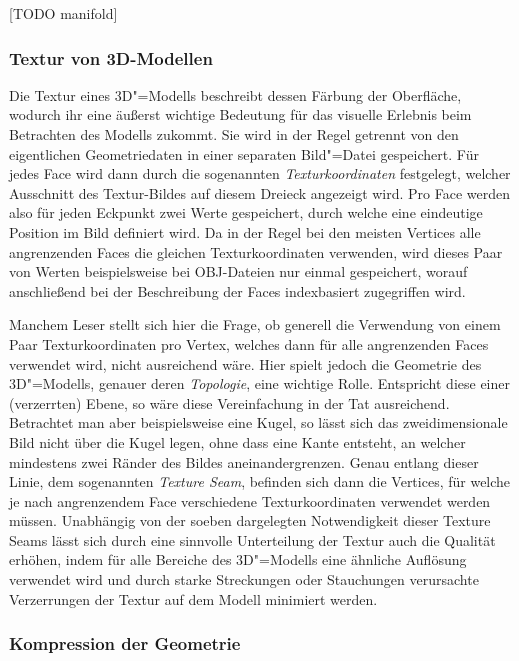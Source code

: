 [TODO manifold] \cite[S.~3]{botsch2010}

\subsubsection{Textur von 3D-Modellen}

Die Textur eines 3D"=Modells beschreibt dessen Färbung der Oberfläche, wodurch ihr eine äußerst wichtige Bedeutung für das visuelle Erlebnis beim Betrachten des Modells zukommt. Sie wird in der Regel getrennt von den eigentlichen Geometriedaten in einer separaten Bild"=Datei gespeichert. Für jedes Face wird dann durch die sogenannten \emph{Texturkoordinaten} festgelegt, welcher Ausschnitt des Textur-Bildes auf diesem Dreieck angezeigt wird. Pro Face werden also für jeden Eckpunkt zwei Werte gespeichert, durch welche eine eindeutige Position im Bild definiert wird. Da in der Regel bei den meisten Vertices alle angrenzenden Faces die gleichen Texturkoordinaten verwenden, wird dieses Paar von Werten beispielsweise bei OBJ-Dateien nur einmal gespeichert, worauf anschließend bei der Beschreibung der Faces indexbasiert zugegriffen wird.

Manchem Leser stellt sich hier die Frage, ob generell die Verwendung von einem Paar Texturkoordinaten pro Vertex, welches dann für alle angrenzenden Faces verwendet wird, nicht ausreichend wäre. Hier spielt jedoch die Geometrie des 3D"=Modells, genauer deren \emph{Topologie}, eine wichtige Rolle. Entspricht diese einer (verzerrten) Ebene, so wäre diese Vereinfachung in der Tat ausreichend. Betrachtet man aber beispielsweise eine Kugel, so lässt sich das zweidimensionale Bild nicht über die Kugel legen, ohne dass eine Kante entsteht, an welcher mindestens zwei Ränder des Bildes aneinandergrenzen. Genau entlang dieser Linie, dem sogenannten \emph{Texture Seam}, befinden sich dann die Vertices, für welche je nach angrenzendem Face verschiedene Texturkoordinaten verwendet werden müssen. Unabhängig von der soeben dargelegten Notwendigkeit dieser Texture Seams lässt sich durch eine sinnvolle Unterteilung der Textur auch die Qualität erhöhen, indem für alle Bereiche des 3D"=Modells eine ähnliche Auflösung verwendet wird und durch starke Streckungen oder Stauchungen verursachte Verzerrungen der Textur auf dem Modell minimiert werden.

\subsubsection{Kompression der Geometrie}


